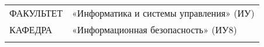 {    \par\vspace{-1.41\ht\strutbox}\noindent\hrulefill\par
    \par\vspace{-1.41\ht\strutbox}\noindent\hrulefill\par
    \par\vspace{-1.41\ht\strutbox}\noindent\hrulefill\par
    \par\vspace{-1.35\ht\strutbox}\noindent\hrulefill\par
    \par\vspace{-1.41\ht\strutbox}\noindent\hrulefill\par

    \vspace{-.2cm}

    \begin{flushleft}
        \fontsize{12}{12}\selectfont

        \noindent
        \begin{tabular}{ll}
            ФАКУЛЬТЕТ    & «Информатика и системы управления» (ИУ) \\[6pt]
            КАФЕДРА      & «Информационная безопасность» (ИУ8)     \\
            \hspace{3cm} &
        \end{tabular}
    \end{flushleft}
}

